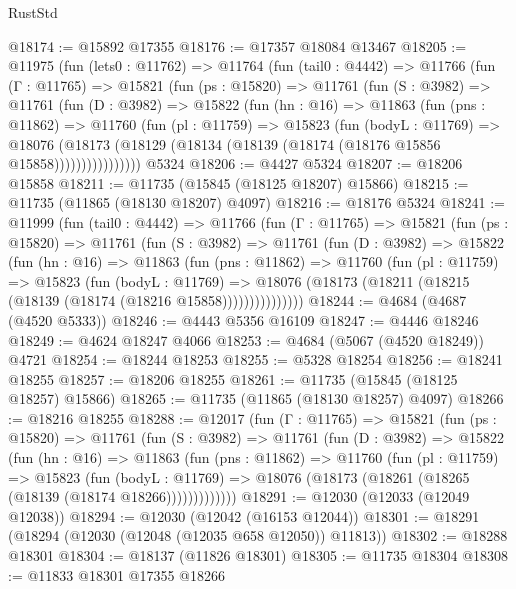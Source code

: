 \begin{lexlean}{RustStd}
\begin{coremodule}
@18174 := @15892 @17355
@18176 := @17357 @18084 @13467
@18205 := @11975
    (fun (lets0 : @11762) =>
    @11764
      (fun (tail0 : @4442) =>
      @11766
        (fun (Γ : @11765) =>
        @15821
          (fun (ps : @15820) =>
          @11761
            (fun (S : @3982) =>
            @11761
              (fun (D : @3982) =>
              @15822
                (fun (hn : @16) =>
                @11863
                  (fun (pns : @11862) =>
                  @11760
                    (fun (pl : @11759) =>
                    @15823
                      (fun (bodyL : @11769) =>
                      @18076
                        (@18173
                          (@18129 (@18134 (@18139 (@18174 (@18176 @15856 @15858))))))))))))))))
    @5324
@18206 := @4427 @5324
@18207 := @18206 @15858
@18211 := @11735 (@15845 (@18125 @18207) @15866)
@18215 := @11735 (@11865 (@18130 @18207) @4097)
@18216 := @18176 @5324
@18241 := @11999
    (fun (tail0 : @4442) =>
    @11766
      (fun (Γ : @11765) =>
      @15821
        (fun (ps : @15820) =>
        @11761
          (fun (S : @3982) =>
          @11761
            (fun (D : @3982) =>
            @15822
              (fun (hn : @16) =>
              @11863
                (fun (pns : @11862) =>
                @11760
                  (fun (pl : @11759) =>
                  @15823
                    (fun (bodyL : @11769) =>
                    @18076 (@18173 (@18211 (@18215 (@18139 (@18174 (@18216 @15858)))))))))))))))
@18244 := @4684 (@4687 (@4520 @5333))
@18246 := @4443 @5356 @16109
@18247 := @4446 @18246
@18249 := @4624 @18247 @4066
@18253 := @4684 (@5067 (@4520 @18249)) @4721
@18254 := @18244 @18253
@18255 := @5328 @18254
@18256 := @18241 @18255
@18257 := @18206 @18255
@18261 := @11735 (@15845 (@18125 @18257) @15866)
@18265 := @11735 (@11865 (@18130 @18257) @4097)
@18266 := @18216 @18255
@18288 := @12017
    (fun (Γ : @11765) =>
    @15821
      (fun (ps : @15820) =>
      @11761
        (fun (S : @3982) =>
        @11761
          (fun (D : @3982) =>
          @15822
            (fun (hn : @16) =>
            @11863
              (fun (pns : @11862) =>
              @11760
                (fun (pl : @11759) =>
                @15823
                  (fun (bodyL : @11769) =>
                  @18076 (@18173 (@18261 (@18265 (@18139 (@18174 @18266)))))))))))))
@18291 := @12030 (@12033 (@12049 @12038))
@18294 := @12030 (@12042 (@16153 @12044))
@18301 := @18291 (@18294 (@12030 (@12048 (@12035 @658 @12050)) @11813))
@18302 := @18288 @18301
@18304 := @18137 (@11826 @18301)
@18305 := @11735 @18304
@18308 := @11833 @18301 @17355 @18266

\end{coremodule}
\end{lexlean}
